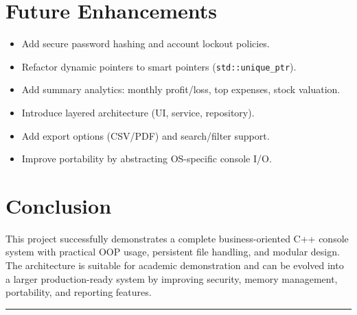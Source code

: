 \documentclass[12pt,a4paper]{article}
\begin{document}
\section{Future Enhancements}
\begin{itemize}[leftmargin=1.4em]
    \item Add secure password hashing and account lockout policies.
    \item Refactor dynamic pointers to smart pointers (\texttt{std::unique\_ptr}).
    \item Add summary analytics: monthly profit/loss, top expenses, stock valuation.
    \item Introduce layered architecture (UI, service, repository).
    \item Add export options (CSV/PDF) and search/filter support.
    \item Improve portability by abstracting OS-specific console I/O.
\end{itemize}

\section{Conclusion}
This project successfully demonstrates a complete business-oriented C++ console system with practical OOP usage, persistent file handling, and modular design. The architecture is suitable for academic demonstration and can be evolved into a larger production-ready system by improving security, memory management, portability, and reporting features.

\vspace{1em}
\begin{center}
\color{accent}\rule{0.82\textwidth}{0.5pt}
\end{center}
\end{document}
